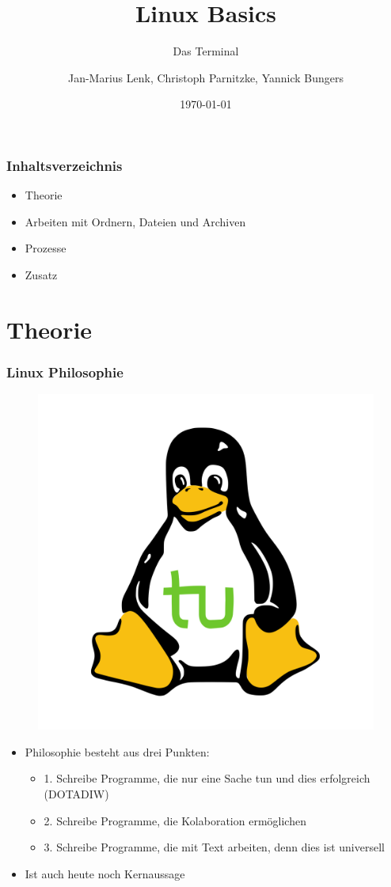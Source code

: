 \documentclass[12pt,utf8, handout]{beamer}
\title{Linux Basics}
\subtitle{Das Terminal}
\author[J.-M. Lenk, C. Parnitzke, Y. Bungers]{Jan-Marius Lenk, Christoph Parnitzke, Yannick Bungers}
\institute[FOSS AG]{Free and Open Source Software AG\\ Fakultät für Informatik}
\date{\today}
\begin{document}
\titlepage

\begin{frame}
\frametitle{Inhaltsverzeichnis}
\begin{itemize}
	\item Theorie
	\item Arbeiten mit Ordnern, Dateien und Archiven
	\item Prozesse
	\item Zusatz
\end{itemize}
\end{frame}

\section{Theorie}
\begin{frame}
\frametitle{Linux Philosophie}
\begin{figure}
\includegraphics[scale=0.15]{res/tuX_tu.png}
\end{figure}
\begin{itemize}
	\item Philosophie besteht aus drei Punkten:
	\begin{itemize}
		\item 1. Schreibe Programme, die nur eine Sache tun und dies erfolgreich (DOTADIW)
		\item 2. Schreibe Programme, die Kolaboration ermöglichen
		\item 3. Schreibe Programme, die mit Text arbeiten, denn dies ist universell
	\end{itemize}
	\item Ist auch heute noch Kernaussage
\end{itemize}
\end{frame}
\end{document}
